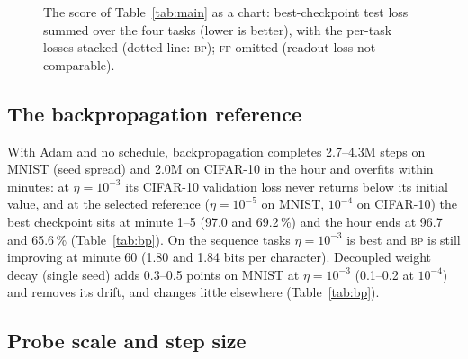 \documentclass{article}
\newcommand{\method}[1]{\textsc{#1}}
\newcommand{\BP}{\method{bp}}
\newcommand{\DANP}{\method{danp}}
\newcommand{\FF}{\method{ff}}
\newcommand{\DUST}{\method{dust}}
\newcommand{\IPC}{\method{ipc}}
\begin{document}
\begin{table}[t]
  \caption{Main result, rows sorted by score $=$ the sum of the four test losses. Per
  task: best-validation-checkpoint test loss and accuracy (\%) or bits per character,
  mean $\pm$ s.d.\ over three seeds (two for the \DANP{} and \FF{} Transformer cells).
  Bold: best probe method per task. \BP{} (one forward and one backward pass per step)
  is the reference; \FF{} is reported by label-accumulation accuracy [readout in
  brackets] and its readout loss is not comparable, so it has no score. 1.5-INP ($\alpha=0$,
  fp64 losses), \DUST{} and \IPC{} were added after the protocol (Section~\ref{sec:own});
  \IPC{} runs on the Transformer only and has no score.}
  \label{tab:main}
  \centering
  \scriptsize
  \setlength{\tabcolsep}{2.5pt}
  \resizebox{\linewidth}{!}{}
\end{table}

\begin{figure}[t]
  \centering
  
  \caption{The score of Table~\ref{tab:main} as a chart: best-checkpoint test loss
  summed over the four tasks (lower is better), with the per-task losses stacked (dotted line: \BP{});
  \FF{} omitted (readout loss not comparable).}
  \label{fig:overall}
\end{figure}

\label{sec:curves}


\subsection{The backpropagation reference}
\label{sec:bpref}

With Adam and no schedule, backpropagation completes 2.7--4.3M steps on MNIST (seed spread) and 2.0M on
CIFAR-10 in the hour and overfits within minutes: at $\eta=10^{-3}$ its CIFAR-10
validation loss never returns below its initial value, and at the selected
reference ($\eta=10^{-5}$ on MNIST, $10^{-4}$ on CIFAR-10) the best checkpoint sits at minute 1--5 (97.0 and 69.2\,\%) and the hour ends at
96.7 and 65.6\,\% (Table~\ref{tab:bp}). On the sequence tasks $\eta=10^{-3}$ is best and \BP{} is still improving at minute
60 (1.80 and 1.84 bits
per character). Decoupled weight decay (single seed) adds 0.3--0.5 points on MNIST at $\eta=10^{-3}$
(0.1--0.2 at $10^{-4}$) and removes its drift, and changes little elsewhere (Table~\ref{tab:bp}).

\subsection{Probe scale and step size}
\label{sec:decouple}
\end{document}
